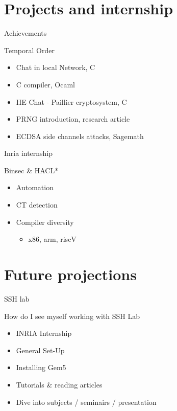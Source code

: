 \documentclass[hyperref={bookmarks=false},aspectratio=169]{beamer}
\begin{document}
\section{Projects and internship}

\begin{frame}{Achievements}
  \begin{block}{Temporal Order}
    \begin{itemize}
      \item<1-> Chat in local Network, C
      \item<2-> C compiler, Ocaml
      \item<3-> HE Chat - Paillier cryptosystem, C
      \item<4-> PRNG introduction, research article
      \item<5-> ECDSA side channels attacks, Sagemath  
    \end{itemize}
  \end{block}
\end{frame}

\begin{frame}{Inria internship}
  \begin{block}{Binsec \& HACL*}
    \begin{itemize}
      \item Automation
      \item CT detection
      \item Compiler diversity
      \begin{itemize}
        \item x86, arm, riscV
      \end{itemize}
    \end{itemize}
  \end{block}
\end{frame}

\section{Future projections}

\begin{frame}{SSH lab}
  
  \begin{block}{How do I see myself working with SSH Lab}
    \begin{itemize}
      \item INRIA Internship
      \pause
      \item General Set-Up
      \item Installing Gem5
      \item Tutorials \& reading articles
      \item Dive into subjects / seminairs / presentation
    \end{itemize}
  \end{block}
\end{frame}
\end{document}
